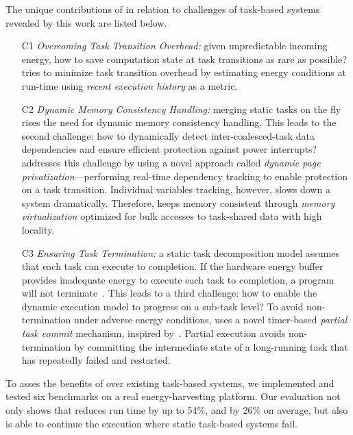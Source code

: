 The unique contributions of \sys in relation to challenges of task-based systems revealed by this work are listed below.

\begin{itemize}

\item[C1] \emph{Overcoming Task Transition Overhead:} given unpredictable incoming energy, how to save computation state at task transitions as rare as possible? \sys tries to minimize task transition overhead by estimating energy conditions at run-time using \emph{recent execution history} as a metric.

\item[C2] \emph{Dynamic Memory Consistency Handling:} merging static tasks on the fly rises  the need for dynamic memory consistency handling. This leads to the second challenge: how to dynamically detect inter-coalesced-task data dependencies and ensure efficient protection against power interrupts? \sys addresses this challenge by using a novel approach called \emph{dynamic page privatization}---performing real-time dependency tracking to enable protection on a task transition. Individual variables tracking, however, slows down a system dramatically. Therefore, \sys keeps memory consistent through \emph{memory virtualization} optimized for bulk accesses to task-shared data with high locality.


\item[C3] \emph{Ensuring Task Termination:} a static task decomposition model assumes that each task can execute to completion. If the hardware energy buffer provides inadequate energy to execute each task to completion, a program will not terminate~\cite{cleancut_2018}. This leads to a third challenge: how to enable the dynamic execution model to progress on a sub-task level? To avoid non-termination under adverse energy conditions, \sys uses a novel timer-based {\em partial task commit} mechanism, inspired by~\cite{ratchet}. Partial execution avoids non-termination by committing the intermediate state of a long-running task that has repeatedly failed and restarted.

\end{itemize}

To asses the benefits of \sys over existing task-based systems, we implemented and tested six benchmarks on a real energy-harvesting platform. Our evaluation not only shows that \sys reduces run time by up to 54\%, and by 26\% on average, but also is able to continue the execution where static task-based systems fail.
 
